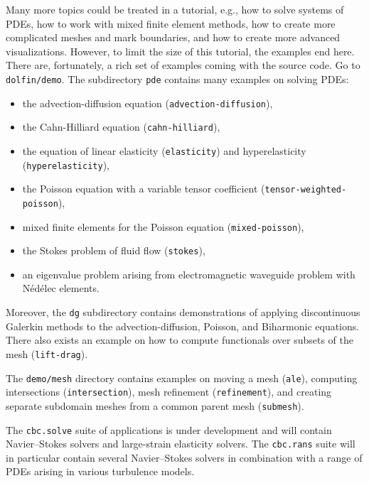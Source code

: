 Many more topics could be treated in a \fenics{} tutorial, e.g., how
to solve systems of PDEs, how to work with mixed finite element
methods, how to create more complicated meshes and mark boundaries,
and how to create more advanced visualizations.  However, to limit the
size of this tutorial, the examples end here.  There are, fortunately,
a rich set of examples coming with the \dolfin{} source code. Go to
{\fontsize{10pt}{10pt}\texttt{dolfin/demo}}. The subdirectory {\fontsize{10pt}{10pt}\texttt{pde}} contains many examples
on solving PDEs: 
\begin{itemize}
\item the advection-diffusion equation ({\fontsize{10pt}{10pt}\texttt{advection-diffusion}}), 
\item the Cahn-Hilliard equation ({\fontsize{10pt}{10pt}\texttt{cahn-hilliard}}), 
\item the equation of linear elasticity ({\fontsize{10pt}{10pt}\texttt{elasticity}}) 
and hyperelasticity ({\fontsize{10pt}{10pt}\texttt{hyperelasticity}}), 
\item the Poisson equation with a variable tensor coefficient
({\fontsize{10pt}{10pt}\texttt{tensor-weighted-poisson}}), 
\item mixed finite elements for the Poisson
equation ({\fontsize{10pt}{10pt}\texttt{mixed-poisson}}), 
\item the Stokes problem of fluid flow ({\fontsize{10pt}{10pt}\texttt{stokes}}),
\item an eigenvalue problem arising from electromagnetic
waveguide problem with N\'{e}d\'{e}lec elements.
\end{itemize}
Moreover, the {\fontsize{10pt}{10pt}\texttt{dg}} subdirectory contains demonstrations of
applying discontinuous Galerkin methods to 
the advection-diffusion, Poisson, and
Biharmonic equations.
There also exists an example on how to compute
functionals over subsets of the mesh ({\fontsize{10pt}{10pt}\texttt{lift-drag}}).

The {\fontsize{10pt}{10pt}\texttt{demo/mesh}} directory contains examples on moving a mesh
({\fontsize{10pt}{10pt}\texttt{ale}}), computing intersections ({\fontsize{10pt}{10pt}\texttt{intersection}}),
mesh refinement ({\fontsize{10pt}{10pt}\texttt{refinement}}), and creating separate subdomain 
meshes from a common parent mesh ({\fontsize{10pt}{10pt}\texttt{submesh}}).

The {\fontsize{10pt}{10pt}\texttt{cbc.solve}} suite of applications is under development and
will contain Navier--Stokes solvers and large-strain elasticity
solvers.  The {\fontsize{10pt}{10pt}\texttt{cbc.rans}} suite will in particular contain several
Navier--Stokes solvers in combination with a range of PDEs arising in
various turbulence models.


